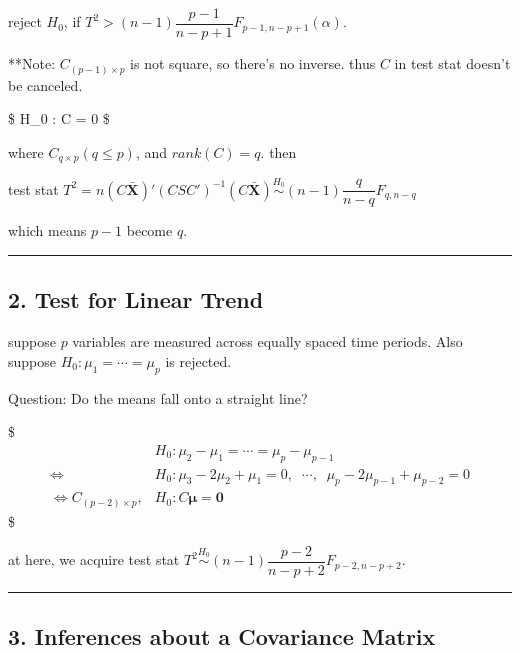 \documentclass[
]{book}
\begin{document}
{{{reject \(H_0\), if \(T^2 > (n-1) \dfrac{p-1}{n-p+1} F_{p-1,n-p+1} (\alpha)\).

**Note: \(C_{(p-1) \times p}\) is not square, so there's no inverse. thus \(C\) in test stat doesn't be canceled.

\$
H\_0 : C \pmb \mu = 0
\$

where \(C_{q \times p} (q \le p)\), and \(rank(C)=q\). then

test stat \(T^2 = n (C \bar {\pmb X})' (C S C')^{-1} (C \bar {\pmb X}) \overset{H_0}{\sim} (n-1) \dfrac{q}{n-q} F_{q,n-q}\)

which means \(p-1\) become \(q\).

\begin{center}\rule{0.5\linewidth}{0.5pt}\end{center}

\hypertarget{test-for-linear-trend}{%
\subsection{2. Test for Linear Trend}\label{test-for-linear-trend}}

suppose \(p\) variables are measured across equally spaced time periods. Also suppose \(H_0 : \mu_1 = \cdots = \mu_p\) is rejected.

Question: Do the means fall onto a straight line?

\$
\begin{align*}

&H_0: \mu_2-\mu_1 = \cdots = \mu_p-\mu_{p-1} \\

\iff &H_0: \mu_3 -2 \mu_2+\mu_1 = 0, \; \; \cdots, \; \; \mu_p - 2 \mu_{p-1} + \mu_{p-2} = 0 \\

\iff C_{(p-2) \times p},  &H_0: C \pmb \mu = \pmb 0

\end{align*}
\$

at here, we acquire test stat \(T^2 \overset {H_0} {\sim} (n-1) \dfrac{p-2}{n-p+2} F_{p-2,n-p+2}\).

\begin{center}\rule{0.5\linewidth}{0.5pt}\end{center}

\hypertarget{inferences-about-a-covariance-matrix}{%
\subsection{3. Inferences about a Covariance Matrix}\label{inferences-about-a-covariance-matrix}}

}}}
\end{document}
